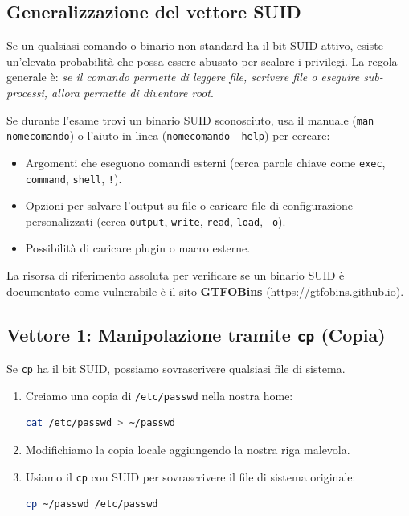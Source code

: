 \documentclass[12pt,a4paper]{report}
\begin{document}
	\subsection{Generalizzazione del vettore SUID}
	Se un qualsiasi comando o binario non standard ha il bit SUID attivo, esiste un'elevata probabilità che possa essere abusato per scalare i privilegi. La regola generale è: \textit{se il comando permette di leggere file, scrivere file o eseguire sub-processi, allora permette di diventare root}.
	
	\begin{nota}
		Se durante l'esame trovi un binario SUID sconosciuto, usa il manuale (\texttt{man nomecomando}) o l'aiuto in linea (\texttt{nomecomando --help}) per cercare:
		\begin{itemize}
			\item Argomenti che eseguono comandi esterni (cerca parole chiave come \texttt{exec}, \texttt{command}, \texttt{shell}, \texttt{!}).
			\item Opzioni per salvare l'output su file o caricare file di configurazione personalizzati (cerca \texttt{output}, \texttt{write}, \texttt{read}, \texttt{load}, \texttt{-o}).
			\item Possibilità di caricare plugin o macro esterne.
		\end{itemize}
		La risorsa di riferimento assoluta per verificare se un binario SUID è documentato come vulnerabile è il sito \textbf{GTFOBins} (\url{https://gtfobins.github.io}).
	\end{nota}
	
	\subsection{Vettore 1: Manipolazione tramite \texttt{cp} (Copia)}
	Se \texttt{cp} ha il bit SUID, possiamo sovrascrivere qualsiasi file di sistema.
	\begin{enumerate}
		\item Creiamo una copia di \texttt{/etc/passwd} nella nostra home:
		\begin{lstlisting}[language=bash]
			cat /etc/passwd > ~/passwd
		\end{lstlisting}
		\item Modifichiamo la copia locale aggiungendo la nostra riga malevola.
		\item Usiamo il \texttt{cp} con SUID per sovrascrivere il file di sistema originale:
		\begin{lstlisting}[language=bash]
			cp ~/passwd /etc/passwd
		\end{lstlisting}
	\end{enumerate}
	
\end{document}
